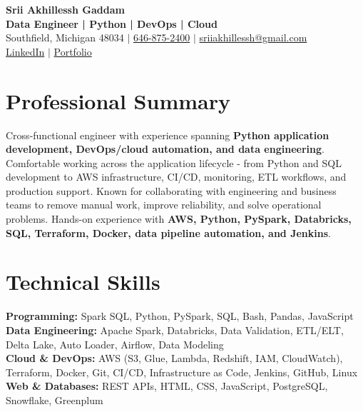 \documentclass[letterpaper,10pt]{article}
\begin{document}
\fontsize{9.35pt}{10.45pt}\selectfont

\begin{center}
    {\LARGE \textbf{Srii Akhillessh Gaddam}} \\[-1pt]
    \textbf{Data Engineer | Python | DevOps | Cloud} \\[2pt]
    Southfield, Michigan 48034 $|$
    \href{tel:6468752400}{646-875-2400} $|$
    \href{mailto:sriiakhillessh@gmail.com}{sriiakhillessh@gmail.com} \\[1pt]
    \href{https://www.linkedin.com/in/srii-akhiilessh-gaddam-b48668191/}{LinkedIn} $|$
    \href{https://sriiakhillesshg.github.io/portfolio/}{Portfolio}
\end{center}
\vspace{-8pt}

\section{Professional Summary}
\small{Cross-functional engineer with experience spanning \textbf{Python application development, DevOps/cloud automation, and data engineering}. Comfortable working across the application lifecycle - from Python and SQL development to AWS infrastructure, CI/CD, monitoring, ETL workflows, and production support. Known for collaborating with engineering and business teams to remove manual work, improve reliability, and solve operational problems. Hands-on experience with \textbf{AWS, Python, PySpark, Databricks, SQL, Terraform, Docker, data pipeline automation, and Jenkins}.}

\section{Technical Skills}
\small{
\textbf{Programming:} Spark SQL, Python, PySpark, SQL, Bash, Pandas, JavaScript \\
\textbf{Data Engineering:} Apache Spark, Databricks, Data Validation, ETL/ELT, Delta Lake, Auto Loader, Airflow, Data Modeling \\
\textbf{Cloud \& DevOps:} AWS (S3, Glue, Lambda, Redshift, IAM, CloudWatch), Terraform, Docker, Git, CI/CD, Infrastructure as Code, Jenkins, GitHub, Linux \\
\textbf{Web \& Databases:} REST APIs, HTML, CSS, JavaScript, PostgreSQL, Snowflake, Greenplum
}
\end{document}
